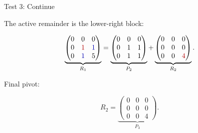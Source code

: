 \documentclass[10pt]{beamer}
\theoremstyle{definition}
\newcommand{\rd}[1]{{\color{red!70!black}#1}}
\newcommand{\bl}[1]{{\color{blue!70!black}#1}}
\begin{document}
\begin{frame}{Test 3: Continue}

The active remainder is the lower-right block:

\[
\underbrace{
\begin{pmatrix}
0&0&0\\
0&\rd{1}&\bl{1}\\
0&\bl{1}&5
\end{pmatrix}}_{R_1}
=
\underbrace{
\begin{pmatrix}
0&0&0\\
0&1&1\\
0&1&1
\end{pmatrix}}_{P_2}
+
\underbrace{
\begin{pmatrix}
0&0&0\\
0&0&0\\
0&0&\rd{4}
\end{pmatrix}}_{R_2}.
\]

\vfill

Final pivot:

$$
R_2=
\underbrace{
\begin{pmatrix}
0&0&0\\
0&0&0\\
0&0&4
\end{pmatrix}}_{P_3}.
$$

\end{frame}
\end{document}
